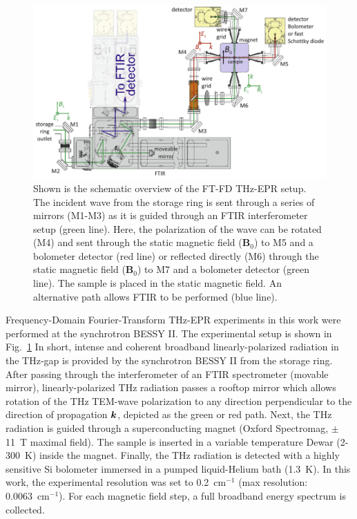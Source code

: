\begin{figure}[htpb]
\centering
  \includegraphics{Kapitel/Ch4-Images/Ch4-ExperimentSetup.eps}%
  \caption[Schematic Overview of FT-FD THz-EPR setup.]{Shown is the schematic overview of the FT-FD THz-EPR setup. The incident wave from the storage ring is sent through a series of mirrors (M1-M3) as it is guided through an FTIR interferometer setup (green line). Here, the polarization of the wave can be rotated (M4) and sent through the static magnetic field (\textbf{B}$_0$) to M5 and a bolometer detector (red line) or reflected directly (M6) through the static magnetic field (\textbf{B}$_0$) to M7 and a bolometer detector (green line). The sample is placed in the static magnetic field. An alternative path allows FTIR to be performed (blue line).}
  \label{ch4-fig:ExFDFTSetup}
\end{figure}

Frequency-Domain Fourier-Transform THz-EPR experiments in this work were performed at the synchrotron BESSY II. The experimental setup is shown in Fig.~\ref{ch4-fig:ExFDFTSetup} \cite{Schnegg09,Nehrkorn13} In short, intense and coherent broadband linearly-polarized radiation in the THz-gap is provided by the synchrotron BESSY II from the storage ring. \cite{AboBakr02} After passing through the interferometer of an FTIR spectrometer (movable mirror), linearly-polarized THz radiation passes a rooftop mirror which allows rotation of the THz TEM-wave polarization to any direction perpendicular to the direction of propagation $\boldsymbol{k}$, depicted as the green or red path. Next, the THz radiation is guided through a superconducting magnet (Oxford Spectromag, $\pm$11~T maximal field). The sample is inserted in a variable temperature Dewar (2-300~K) inside the magnet. Finally, the THz radiation is detected with a highly sensitive Si bolometer immersed in a pumped liquid-Helium bath (1.3~K). In this work, the experimental resolution was set to 0.2~cm$^{-1}$ (max resolution: 0.0063~cm$^{-1}$). For each magnetic field step, a full broadband energy spectrum is collected. 

